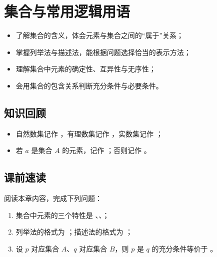 \section{集合与常用逻辑用语}

\begin{learnobjective}
\begin{itemize}
  \item 了解集合的含义，体会元素与集合之间的“属于”关系；
  \item 掌握列举法与描述法，能根据问题选择恰当的表示方法；
  \item 理解集合中元素的确定性、互异性与无序性；
  \item 会用集合的包含关系判断充分条件与必要条件。
\end{itemize}
\end{learnobjective}

\begin{preview}
\subsection*{知识回顾}
\begin{itemize}
  \item 自然数集记作 \blank，有理数集记作 \blank，实数集记作 \blank；
  \item 若 $a$ 是集合 $A$ 的元素，记作 \blank；否则记作 \blank。
\end{itemize}

\subsection*{课前速读}
阅读本章内容，完成下列问题：
\begin{enumerate}
  \item 集合中元素的三个特性是 \blank、\blank、\blank；
  \item 列举法的格式为 \blank；描述法的格式为 \blank；
  \item 设 $p$ 对应集合 $A$、$q$ 对应集合 $B$，则 $p$ 是 $q$ 的充分条件等价于 \blank。
\end{enumerate}
\end{preview}

